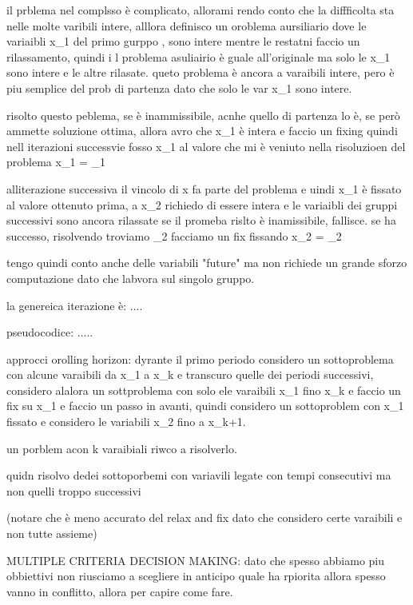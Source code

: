 il prblema nel complsso è complicato, allorami rendo conto che la diffficolta sta nelle molte varibili intere, alllora definisco un oroblema aursiliario dove le variaibli x_1 del primo gurppo , sono intere mentre le restatni faccio un rilassamento, quindi i l problema asuliairio è guale all'originale ma solo le x_1 sono intere e le altre rilasate. queto problema è ancora a varaibili intere, pero è piu semplice del prob di partenza dato che solo le var x_1 sono intere.

risolto questo peblema, se è inammissibile, acnhe quello di partenza lo è, se però ammette soluzione ottima, allora avro che x_1 è intera e faccio un fixing quindi nell iterazioni successvie fosso x_1 al valore che mi è veniuto nella risoluzioen del problema 
x_1 = _1

alliterazione successiva il vincolo di x fa parte del problema e uindi x_1 è fissato al valore ottenuto prima, a x_2 richiedo di essere intera e le variaibli dei gruppi successivi sono ancora rilassate se il promeba rislto è inamissibile, fallisce. se ha successo, risolvendo troviamo \oveline{}_2 facciamo un fix fissando x_2 = \oveline{}_2

tengo quindi conto anche delle variabili "future" ma non richiede un grande sforzo computazione dato che labvora sul singolo gruppo.

la genereica iterazione è:
....

pseudocodice:
.....



approcci orolling horizon:
dyrante il primo periodo considero un sottoproblema con alcune varaibili da x_1 a x_k e transcuro quelle dei periodi successivi, considero alalora un sottproblema con solo ele varaibili x_1 fino x_k e faccio un fix su x_1 e faccio un passo in avanti, quindi considero un sottoproblem con x_1 fissato e considero le variabili x_2 fino a x_k+1.

un porblem acon k varaibiali riwco a risolverlo.

quidn risolvo dedei sottoporbemi con variavili legate con tempi consecutivi ma non quelli troppo successivi

(notare che è meno accurato del relax and fix dato che considero certe varaibili e non tutte assieme)





MULTIPLE CRITERIA DECISION MAKING:
dato che spesso abbiamo piu obbiettivi non riusciamo a scegliere in anticipo quale ha rpiorita allora spesso vanno in conflitto, allora per capire come fare. 

